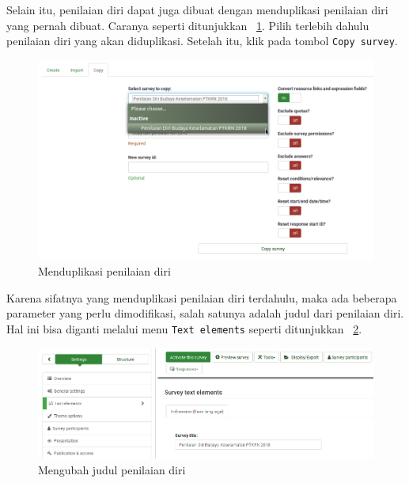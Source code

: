 Selain itu, penilaian diri dapat juga dibuat dengan menduplikasi penilaian diri yang pernah dibuat. Caranya seperti ditunjukkan \figurename~\ref{fig:copy}. Pilih terlebih dahulu penilaian diri yang akan diduplikasi. Setelah itu, klik pada tombol \texttt{Copy survey}.

\begin{figure}
  \begin{center}
    \includegraphics[scale=.35]{pics/copySurvey.png}
    \caption{Menduplikasi penilaian diri}
    \label{fig:copy}
  \end{center}
\end{figure}

Karena sifatnya yang menduplikasi penilaian diri terdahulu, maka ada beberapa parameter yang perlu dimodifikasi, salah satunya adalah judul dari penilaian diri. Hal ini bisa diganti melalui menu \texttt{Text elements} seperti ditunjukkan \figurename~\ref{fig:gantiJudul}.

\begin{figure}
  \begin{center}
    \includegraphics[scale=.5]{pics/modifSurveyTitle.png}
    \caption{Mengubah judul penilaian diri}
    \label{fig:gantiJudul}
  \end{center}
\end{figure}

